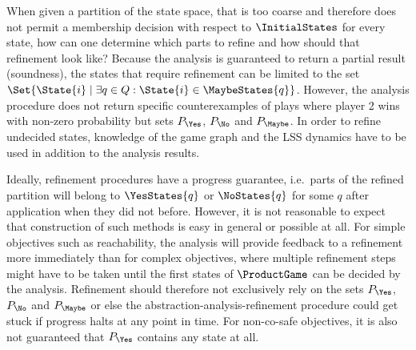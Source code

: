 When given a partition of the state space, that is too coarse and therefore does not permit a membership decision with respect to $\InitialStates$ for every state, how can one determine which parts to refine and how should that refinement look like?
Because the analysis is guaranteed to return a partial result (soundness), the states that require refinement can be limited to the set $\Set{ \State{i} \mid \exists q \in Q : \State{i} \in \MaybeStates{q} }$.
However, the analysis procedure does not return specific counterexamples of plays where player 2 wins with non-zero probability but sets $P_{\Yes}$, $P_{\No}$ and $P_{\Maybe}$.
In order to refine undecided states, knowledge of the game graph and the LSS dynamics have to be used in addition to the analysis results.

Ideally, refinement procedures have a progress guarantee, i.e.\ parts of the refined partition will belong to $\YesStates{q}$ or $\NoStates{q}$ for some $q$ after application when they did not before.
However, it is not reasonable to expect that construction of such methods is easy in general or possible at all.
For simple objectives such as reachability, the analysis will provide feedback to a refinement more immediately than for complex objectives, where multiple refinement steps might have to be taken until the first states of $\ProductGame$ can be decided by the analysis.
Refinement should therefore not exclusively rely on the sets $P_{\Yes}$, $P_{\No}$ and $P_{\Maybe}$ or else the abstraction-analysis-refinement procedure could get stuck if progress halts at any point in time.
For non-co-safe objectives, it is also not guaranteed that $P_{\Yes}$ contains any state at all.

